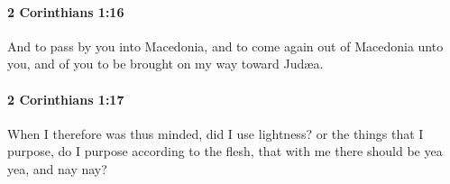 		\paragraph{2 Corinthians 1:16} %
			\label{2CORINTHIANS-1-16}

			And to pass by you into Macedonia, and to come again out of Macedonia unto you, and of you to be brought on my way toward Judæa.

			\begin{framed}
			\scriptsize
				\begin{compactdesc}
					\item[SBLG] 
				\end{compactdesc}
			\end{framed}

		\paragraph{2 Corinthians 1:17} %
			\label{2CORINTHIANS-1-17}

			When I therefore was thus minded, did I use lightness?  or the things that I purpose, do I purpose according to the flesh, that with me there should be yea yea, and nay nay?

